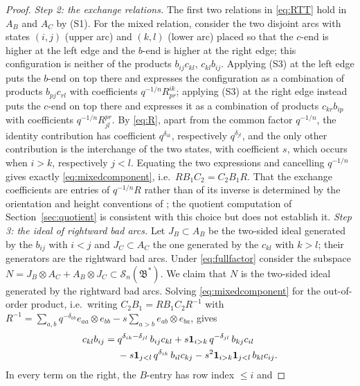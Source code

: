\documentclass[11pt]{article}
\theoremstyle{remark}
\newcommand{\Skein}{\mathcal S_n}
\newcommand{\Bstar}{\mathfrak B^*}
\newcommand{\ot}{\otimes}
\begin{document}
\begin{proof}
\emph{Step 2: the exchange relations.}
The first two relations in \eqref{eq:RTT} hold in $A_B$ and $A_C$ by
(S1). For the mixed relation, consider the two disjoint arcs with
states $(i,j)$ (upper arc) and $(k,l)$ (lower arc) placed so that the
$c$-end is higher at the left edge and the $b$-end is higher at the
right edge; this configuration is neither of the products
$b_{ij}c_{kl}$, $c_{kl}b_{ij}$. Applying (S3) at the left edge puts
the $b$-end on top there and expresses the configuration as a
combination of products $b_{pj}c_{rl}$ with coefficients
$q^{-1/n}R^{ik}_{pr}$; applying (S3) at the right edge instead puts the
$c$-end on top there and expresses it as a combination of products
$c_{kr}b_{ip}$ with coefficients $q^{-1/n}R^{pr}_{jl}$. By
\eqref{eq:R}, apart from the common factor $q^{-1/n}$, the identity
contribution has coefficient $q^{\delta_{ik}}$, respectively
$q^{\delta_{jl}}$, and the only other contribution is the interchange
of the two states, with coefficient $s$, which occurs when $i>k$,
respectively $j<l$. Equating the two expressions and cancelling
$q^{-1/n}$ gives exactly \eqref{eq:mixedcomponent}, i.e.\
$RB_1C_2=C_2B_1R$. That the exchange coefficients are entries of
$q^{-1/n}R$ rather than of its inverse is determined by the orientation
and height conventions of \cite[Section 4.10]{LY}; the quotient
computation of Section~\ref{sec:quotient} is consistent with this
choice but does not establish it.
\emph{Step 3: the ideal of rightward bad arcs.}
Let $J_B\subset A_B$ be the two-sided ideal generated by the $b_{ij}$
with $i<j$ and $J_C\subset A_C$ the one generated by the $c_{kl}$ with
$k>l$; their generators are the rightward bad arcs. Under
\eqref{eq:fullfactor} consider the subspace
$N=J_B\ot A_C+A_B\ot J_C\subset\Skein(\Bstar)$. We claim that $N$ is the two-sided ideal generated by the rightward
bad arcs. Solving \eqref{eq:mixedcomponent} for the out-of-order
product, i.e.\ writing $C_2B_1=RB_1C_2R^{-1}$ with
$R^{-1}=\sum_{a,b}q^{-\delta_{ab}}e_{aa}\ot e_{bb}
-s\sum_{a>b}e_{ab}\ot e_{ba}$, gives
\begin{align}
 c_{kl}b_{ij}
 ={}&q^{\delta_{ik}-\delta_{jl}}\,b_{ij}c_{kl}
     +s\mathbf1_{i>k}\,q^{-\delta_{jl}}\,b_{kj}c_{il} \notag\\
   &-s\mathbf1_{j<l}\,q^{\delta_{ik}}\,b_{il}c_{kj}
     -s^2\mathbf1_{i>k}\mathbf1_{j<l}\,b_{kl}c_{ij}.
                                                        \label{eq:reorder}
\end{align}
In every term on the right, the $B$-entry has row index $\le i$ and

\end{proof}
\end{document}
